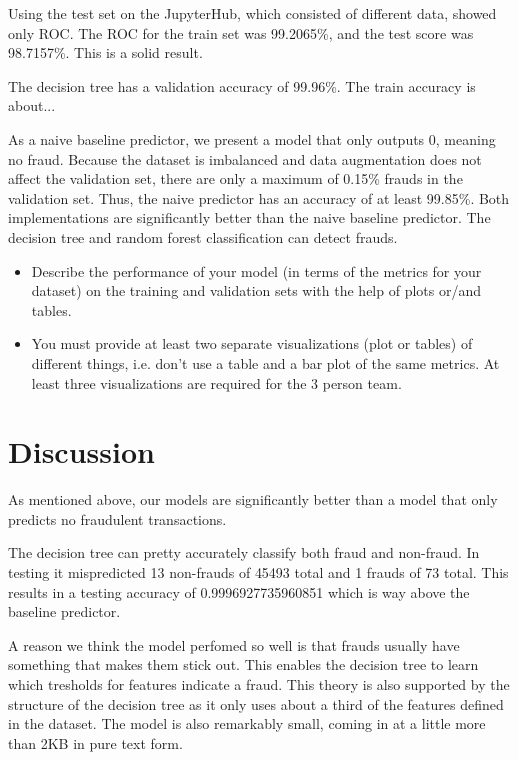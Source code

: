 \documentclass[a4paper, 10pt, conference]{ieeeconf}      %
\begin{document}
Using the test set on the JupyterHub, which consisted of different data, showed only ROC. The ROC for the train set was 99.2065\%, and the test score was 98.7157\%. This is a solid result.

The decision tree has a validation accuracy of 99.96\%. The train accuracy is about... %

As a naive baseline predictor, we present a model that only outputs 0, meaning no fraud. 
Because the dataset is imbalanced and data augmentation does not affect the validation set, there are only a maximum of 0.15\% frauds in the validation set. 
Thus, the naive predictor has an accuracy of at least 99.85\%. 
Both implementations are significantly better than the naive baseline predictor. The decision tree and random forest classification can detect frauds.

{\color{blue}
\begin{itemize}
	\item Describe the performance of your model (in terms of the metrics for your dataset) on the training and validation sets with the help of plots or/and tables.
	\item You must provide at least two separate visualizations
          (plot or tables) of different things, i.e. don’t use a table
          and a bar plot of the same metrics. At least three
           visualizations are required for the 3 person team.
\end{itemize}
}

\section{Discussion}
\label{sec:discuss}
As mentioned above, our models are significantly better than a model that only predicts no fraudulent transactions.

The decision tree can pretty accurately classify both fraud and non-fraud. 
In testing it mispredicted 13 non-frauds of 45493 total and 1 frauds of 73 total.
This results in a testing accuracy of 0.9996927735960851 which is way above the baseline predictor.

A reason we think the model perfomed so well is that frauds usually have something that makes them stick out. 
This enables the decision tree to learn which tresholds for features indicate a fraud. 
This theory is also supported by the structure of the decision tree as it only uses about a third of the features defined in the dataset.
The model is also remarkably small, coming in at a little more than 2KB in pure text form.
\end{document}
